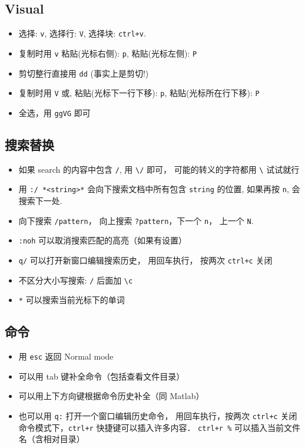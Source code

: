 \subsection{Visual}
\begin{itemize}
\item 选择: \verb`v`, 选择行: \verb`V`, 选择块: \verb`ctrl+v`.
\item 复制时用 \verb`v` 粘贴(光标右侧): \verb`p`, 粘贴(光标左侧): \verb`P`
\item 剪切整行直接用 \verb`dd` (事实上是剪切!)
\item 复制时用 \verb`V` 或, 粘贴(光标下一行下移): \verb`p`, 粘贴(光标所在行下移): \verb`P`
\item 全选，用 \verb`ggVG` 即可
\end{itemize}

\subsection{搜索替换}
\begin{itemize}
\item 如果 search 的内容中包含 \verb`/`, 用 \verb`\/` 即可， 可能的转义的字符都用 \verb`\` 试试就行
\item 用 \verb`:/ *<string>*` 会向下搜索文档中所有包含 \verb`string` 的位置, 如果再按 \verb`n`, 会搜索下一处. 
\item 向下搜索 \verb`/pattern`， 向上搜索 \verb`?pattern`，下一个 \verb`n`， 上一个 \verb`N`.
\item \verb`:noh` 可以取消搜索匹配的高亮（如果有设置）
\item \verb`q/` 可以打开新窗口编辑搜索历史， 用回车执行， 按两次 \verb`ctrl+c` 关闭
\item 不区分大小写搜索:  \verb`/` 后面加 \verb`\c`
\item \verb`*` 可以搜索当前光标下的单词
\end{itemize}

\subsection{命令}
\begin{itemize}
\item 用 \verb`esc` 返回 Normal mode
\item 可以用 tab 键补全命令（包括查看文件目录）
\item 可以用上下方向键根据命令历史补全（同 Matlab）
\item 也可以用 \verb`q:` 打开一个窗口编辑历史命令， 用回车执行，按两次 \verb`ctrl+c` 关闭
命令模式下，\verb`ctrl+r` 快捷键可以插入许多内容． \verb`ctrl+r %` 可以插入当前文件名（含相对目录）
\end{itemize}

